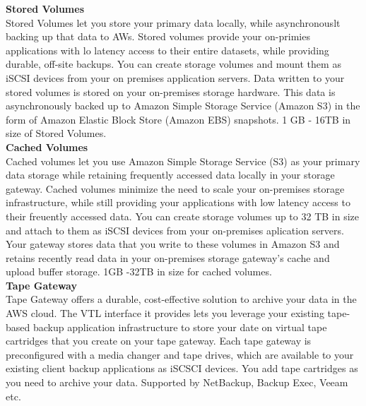\documentclass{article}
\begin{document}
\noindent
\textbf{Stored Volumes}\\
\noindent
Stored Volumes let you store your primary data locally, while asynchronouslt backing up that data to AWs. Stored volumes provide your on-primies applications with lo latency access to their entire datasets, while providing durable, off-site backups. You can create storage volumes and mount them as iSCSI devices from your on premises application servers. Data written to your stored volumes is stored on your on-premises storage hardware. This data is asynchronously backed up to Amazon Simple Storage Service (Amazon S3) in the form of Amazon Elastic Block Store (Amazon EBS) snapshots. 1 GB - 16TB in size of Stored Volumes. \\

\noindent
\textbf{Cached Volumes}\\
\noindent
Cached volumes let you use Amazon Simple Storage Service (S3) as your primary data storage while retaining frequently accessed data locally in your storage gateway. Cached volumes minimize the need to scale your on-premises storage infrastructure, while still providing your applications with low latency access to their freuently accessed data. You can create storage volumes up to 32 TB in size and attach to them as iSCSI devices from your on-premises aplication servers. Your gateway stores data that you write to these volumes in Amazon S3 and retains recently read data in your on-premises storage gateway's cache and upload buffer storage. 1GB -32TB in size for cached volumes. \\

\noindent
\textbf{Tape Gateway}\\
\noindent
Tape Gateway offers a durable, cost-effective solution to archive your data in the AWS cloud. The VTL interface it provides lets you leverage your existing tape-based backup application infrastructure to store your date on virtual tape cartridges that you create on your tape gateway. Each tape gateway is preconfigured with a media changer and tape drives, which are available to your existing client backup applications as iSCSCI devices. You add tape cartridges as you need to archive your data. Supported by NetBackup, Backup Exec, Veeam etc. \\
\end{document}

